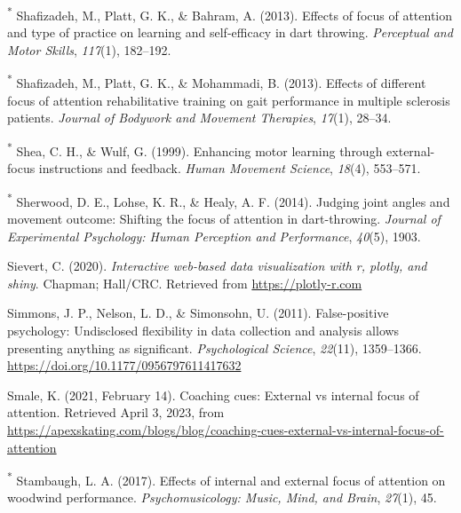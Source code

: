 \documentclass[
  man, donotrepeattitle,floatsintext]{apa7}
\newlength{\cslhangindent}
\newlength{\cslentryspacingunit} %
\newenvironment{CSLReferences}[2] %
 {%
  \setlength{\parindent}{0pt}
  \ifodd #1
  \let\oldpar\par
  \def\par{\hangindent=\cslhangindent\oldpar}
  \fi
  \setlength{\parskip}{#2\cslentryspacingunit}
 }%
 {}
\begin{document}
\begin{CSLReferences}{1}{0}
\leavevmode{}%
\textsuperscript{*} Shafizadeh, M., Platt, G. K., \& Bahram, A. (2013). Effects of focus of attention and type of practice on learning and self-efficacy in dart throwing. \emph{Perceptual and Motor Skills}, \emph{117}(1), 182--192.

\leavevmode{}%
\textsuperscript{*} Shafizadeh, M., Platt, G. K., \& Mohammadi, B. (2013). Effects of different focus of attention rehabilitative training on gait performance in multiple sclerosis patients. \emph{Journal of Bodywork and Movement Therapies}, \emph{17}(1), 28--34.

\leavevmode{}%
\textsuperscript{*} Shea, C. H., \& Wulf, G. (1999). Enhancing motor learning through external-focus instructions and feedback. \emph{Human Movement Science}, \emph{18}(4), 553--571.

\leavevmode{}%
\textsuperscript{*} Sherwood, D. E., Lohse, K. R., \& Healy, A. F. (2014). Judging joint angles and movement outcome: Shifting the focus of attention in dart-throwing. \emph{Journal of Experimental Psychology: Human Perception and Performance}, \emph{40}(5), 1903.

\leavevmode{}%
Sievert, C. (2020). \emph{Interactive web-based data visualization with r, plotly, and shiny}. Chapman; Hall/CRC. Retrieved from \url{https://plotly-r.com}

\leavevmode{}%
Simmons, J. P., Nelson, L. D., \& Simonsohn, U. (2011). False-positive psychology: {Undisclosed} flexibility in data collection and analysis allows presenting anything as significant. \emph{Psychological Science}, \emph{22}(11), 1359--1366. \url{https://doi.org/10.1177/0956797611417632}

\leavevmode{}%
Smale, K. (2021, February 14). Coaching cues: {External} vs internal focus of attention. Retrieved April 3, 2023, from \url{https://apexskating.com/blogs/blog/coaching-cues-external-vs-internal-focus-of-attention}

\leavevmode{}%
\textsuperscript{*} Stambaugh, L. A. (2017). Effects of internal and external focus of attention on woodwind performance. \emph{Psychomusicology: Music, Mind, and Brain}, \emph{27}(1), 45.


\end{CSLReferences}
\end{document}
